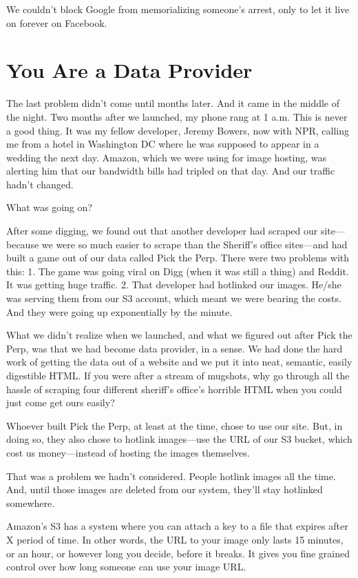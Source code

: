\documentclass[
  letterpaper,
  DIV=11,
  numbers=noendperiod]{scrreprt}
\begin{document}
We couldn't block Google from memorializing someone's arrest, only to
let it live on forever on Facebook.

\hypertarget{you-are-a-data-provider}{%
\section{You Are a Data Provider}\label{you-are-a-data-provider}}

The last problem didn't come until months later. And it came in the
middle of the night. Two months after we launched, my phone rang at 1
a.m. This is never a good thing. It was my fellow developer, Jeremy
Bowers, now with NPR, calling me from a hotel in Washington DC where he
was supposed to appear in a wedding the next day. Amazon, which we were
using for image hosting, was alerting him that our bandwidth bills had
tripled on that day. And our traffic hadn't changed.

What was going on?

After some digging, we found out that another developer had scraped our
site---because we were so much easier to scrape than the Sheriff's
office sites---and had built a game out of our data called Pick the
Perp. There were two problems with this: 1. The game was going viral on
Digg (when it was still a thing) and Reddit. It was getting huge
traffic. 2. That developer had hotlinked our images. He/she was serving
them from our S3 account, which meant we were bearing the costs. And
they were going up exponentially by the minute.

What we didn't realize when we launched, and what we figured out after
Pick the Perp, was that we had become data provider, in a sense. We had
done the hard work of getting the data out of a website and we put it
into neat, semantic, easily digestible HTML. If you were after a stream
of mugshots, why go through all the hassle of scraping four different
sheriff's office's horrible HTML when you could just come get ours
easily?

Whoever built Pick the Perp, at least at the time, chose to use our
site. But, in doing so, they also chose to hotlink images---use the URL
of our S3 bucket, which cost us money---instead of hosting the images
themselves.

That was a problem we hadn't considered. People hotlink images all the
time. And, until those images are deleted from our system, they'll stay
hotlinked somewhere.

Amazon's S3 has a system where you can attach a key to a file that
expires after X period of time. In other words, the URL to your image
only lasts 15 minutes, or an hour, or however long you decide, before it
breaks. It gives you fine grained control over how long someone can use
your image URL.
\end{document}
